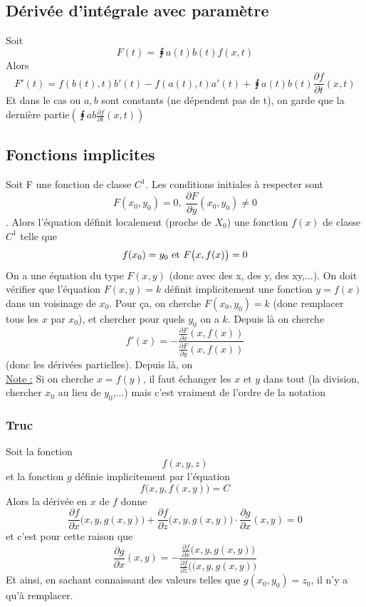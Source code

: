 \documentclass[12pt,a4paper]{article}
\renewcommand{\)}{\right)}
\renewcommand{\(}{\left(}
\begin{document}
\subsection{Dérivée d'intégrale avec paramètre}
Soit 
\begin{equation*}
	F(t) = \intx{a(t)}{b(t)}{f(x,t)}
\end{equation*}
Alors
\begin{equation*}
	F'(t) = f(b(t),t) b'(t) - f(a(t),t)a'(t) + \intx{a(t)}{b(t)}{\frac{\partial f}{\partial t}(x,t)}
\end{equation*}
Et dans le cas ou $a,b$ sont constants (ne dépendent pas de t), on garde que la dernière partie$\(\intx{a}{b}{\frac{\partial f}{\partial t}(x,t)}\)$

\subsection{Fonctions implicites}
Soit F une fonction de classe $C^1$. Les conditions initiales à respecter sont \[F(x_0,y_0) = 0,\ \frac{\partial F}{\partial y}(x_0,y_0)\neq 0\]. Alors l'équation définit localement (proche de $X_0$) une fonction $f(x)$ de classe $C^1$ telle que \[f(x_0) = y_0 \mbox{ et } F\big(x,f(x)\big) = 0\]
On a une équation du type $F(x,y)$ (donc avec des x, des y, des xy,...). On doit vérifier que l'équation $F(x,y) = k$ définit implicitement une fonction $y = f(x)$ dans un voisinage de $x_0$. Pour ça, on cherche $F(x_0,y_0) = k$ (donc remplacer tous les $x$ par $x_0$), et chercher pour quels $y_0$ on a $k$. Depuis là on cherche 
\begin{equation*}
	f'(x) = -\frac{\frac{\partial F}{\partial x} (x,f(x))}{\frac{\partial F}{\partial y}(x,f(x))}
\end{equation*}
(donc les dérivées partielles). Depuis là, on  \\
\uline{Note :} Si on cherche $x = f(y)$, il faut échanger les $x$ et $y$ dans tout (la division, chercher $x_0$ au lieu de $y_0$,...) mais c'est vraiment de l'ordre de la notation
\subsubsection{Truc}
Soit la fonction \[f(x,y,z)\] et la fonction $g$ définie implicitement par l'équation \[f\big(x,y,f(x,y)\big) = C\] Alors la dérivée en $x$ de $f$ donne \[\frac{\partial f}{\partial x}\big(x,y,g(x,y)\big) + \frac{\partial f}{\partial z}\big(x,y,g(x,y)\big) \cdot \frac{\partial g}{\partial x}(x,y) = 0\]
et c'est pour cette raison que
\[\frac{\partial g}{\partial x}(x,y) = -\frac{\frac{\partial f}{\partial x}\big(x,y,g(x,y)\big)}{\frac{\partial f}{\partial z}(\big(x,y,g(x,y)\big)}\] Et ainsi, en sachant connaissant des valeurs telles que $g(x_0,y_0) = z_0$, il n'y a qu'à remplacer.
\end{document}
